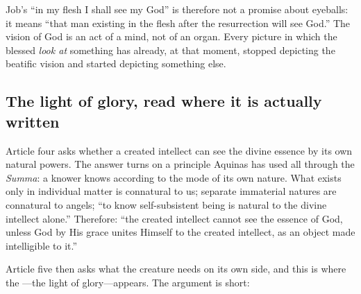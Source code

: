 Job's ``in my flesh I shall see my God'' is therefore not a promise about eyeballs: it means ``that man existing in the flesh after the resurrection will see God.'' The vision of God is an act of a mind, not of an organ. Every picture in which the blessed \emph{look at} something has already, at that moment, stopped depicting the beatific vision and started depicting something else.

\subsection{The light of glory, read where it is actually written}

Article four asks whether a created intellect can see the divine essence by its own natural powers. The answer turns on a principle Aquinas has used all through the \emph{Summa}: a knower knows according to the mode of its own nature. What exists only in individual matter is connatural to us; separate immaterial natures are connatural to angels; ``to know self-subsistent being is natural to the divine intellect alone.'' Therefore: ``the created intellect cannot see the essence of God, unless God by His grace unites Himself to the created intellect, as an object made intelligible to it.''

Article five then asks what the creature needs on its own side, and this is where the ---the light of glory---appears. The argument is short:

